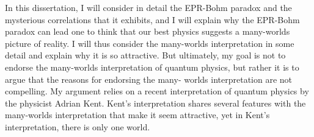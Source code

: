 \vspace{12.96pt} %
 In this dissertation, I will consider in detail the EPR-Bohm paradox and the mysterious correlations that it exhibits, and I will explain why the EPR-Bohm paradox can lead one to think that our best physics suggests a many-worlds picture of reality. I will thus consider the many-worlds interpretation in some detail and explain why it is so attractive. But ultimately, my goal is not to endorse the many-worlds interpretation of quantum physics, but rather it is to argue that the reasons for endorsing the many- worlds interpretation are not compelling. My argument relies on a recent interpretation of quantum physics by the physicist Adrian Kent. Kent's interpretation shares several features with the many-worlds interpretation that make it seem attractive, yet in Kent's interpretation, there is only one world.




\pagebreak


